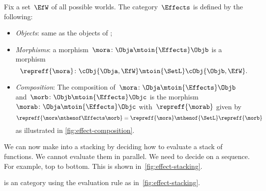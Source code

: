 \begin{definition}
    \label{def:Effects}
    Fix a set~$\EfW$ of all possible worlds.
    The category~$\Effects$ is defined by the following:
    \begin{itemize}
        \item \emph{Objects}: same as the objects of \SetL;
        \item \emph{Morphisms}: a morphism~$\mora\colon \Obja \mtoin{\Effects} \Objb$ is a morphism
              \begin{equation}
                  \repreff{\mora}\colon \cObj{\Obja, \EfW} \mtoin{\SetL} \cObj{\Objb, \EfW}.
              \end{equation}
        \item \emph{Composition}: The composition of~$\mora\colon \Obja \mtoin{\Effects} \Objb$ and~$\morb\colon \Objb \mtoin{\Effects} \Objc$ is the morphism~$\morab\colon \Obja \mtoin{\Effects} \Objc$ with~$\repreff{\morab}$ given by
              \begin{equation}
                  \repreff{\mora \mthenof \Effects \morb}
                  = \repreff{\mora} \mthenof{\SetL} \repreff{\morb}
              \end{equation}
              as illustrated in \cref{fig:effect-composition}.
    \end{itemize}
\end{definition}

\begin{marginfigure}
    \centering

    \caption{}
    \label{fig:effect-stacking}
\end{marginfigure}

We can now make \Effects into a stacking  by deciding how to evaluate a stack of functions.
We cannot evaluate them in parallel.
We need to decide on a sequence.
For example, top to bottom.
This is shown in~\cref{fig:effect-stacking}.

\begin{lemma}
    \label{lem:effects-is-stacking}
    \Effects is an   category using the evaluation rule as in~\cref{fig:effect-stacking}.
\end{lemma}

